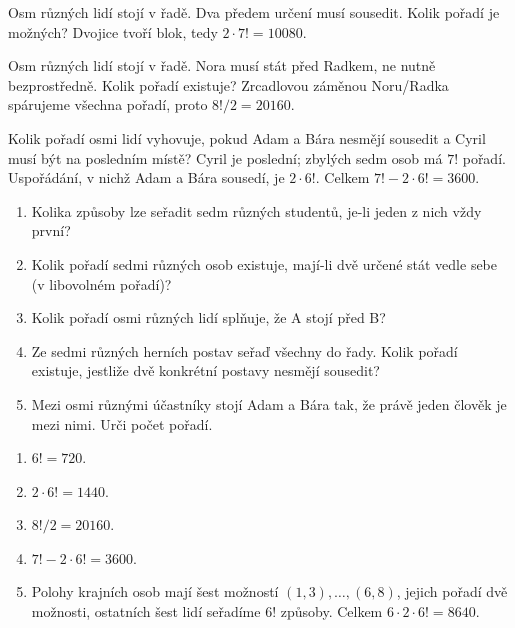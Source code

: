 \documentclass[11pt,a4paper]{article}
\begin{document}

\begin{zadaniReseniBox}[title={Samostatná práce 1}]
Osm různých lidí stojí v řadě. Dva předem určení musí sousedit. Kolik pořadí je možných?
\tcblower
Dvojice tvoří blok, tedy $2\cdot7!=10080$.
\end{zadaniReseniBox}
\begin{zadaniReseniBox}[title={Samostatná práce 2}]
Osm různých lidí stojí v řadě. Nora musí stát před Radkem, ne nutně bezprostředně. Kolik pořadí existuje?
\tcblower
Zrcadlovou záměnou Noru/Radka spárujeme všechna pořadí, proto $8!/2=20160$.
\end{zadaniReseniBox}
\begin{zadaniReseniBox}[title={Rozšíření 1}]
Kolik pořadí osmi lidí vyhovuje, pokud Adam a Bára nesmějí sousedit a Cyril musí být na posledním místě?
\tcblower
Cyril je poslední; zbylých sedm osob má $7!$ pořadí. Uspořádání, v nichž Adam a Bára sousedí, je $2\cdot6!$. Celkem $7!-2\cdot6!=3600$.
\end{zadaniReseniBox}
\begin{zadaniReseniBox}[title={Domácí úkol}]
\begin{enumerate}[label=\alph*),leftmargin=*,itemsep=2pt]
\item Kolika způsoby lze seřadit sedm různých studentů, je-li jeden z nich vždy první?
\item Kolik pořadí sedmi různých osob existuje, mají-li dvě určené stát vedle sebe (v libovolném pořadí)?
\item Kolik pořadí osmi různých lidí splňuje, že A stojí před B?
\item Ze sedmi různých herních postav seřaď všechny do řady. Kolik pořadí existuje, jestliže dvě konkrétní postavy nesmějí sousedit?
\item Mezi osmi různými účastníky stojí Adam a Bára tak, že právě jeden člověk je mezi nimi. Urči počet pořadí.
\end{enumerate}
\tcblower
\begin{enumerate}[label=\alph*),leftmargin=*,itemsep=2pt]
\item $6!=720$.
\item $2\cdot6!=1440$.
\item $8!/2=20160$.
\item $7!-2\cdot6!=3600$.
\item Polohy krajních osob mají šest možností $(1,3),\ldots,(6,8)$, jejich pořadí dvě možnosti, ostatních šest lidí seřadíme $6!$ způsoby. Celkem $6\cdot2\cdot6!=8640$.
\end{enumerate}
\end{zadaniReseniBox}
\end{document}

